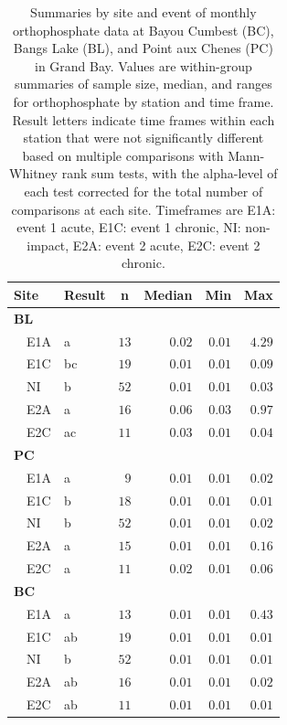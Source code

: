 \documentclass[letterpaper,12pt]{article}\usepackage[]{graphicx}\usepackage[]{color}
\newcommand{\beginsupplement}{%
        \setcounter{table}{0}
        \renewcommand{\thetable}{S\arabic{table}}%
        \setcounter{figure}{0}
        \renewcommand{\thefigure}{S\arabic{figure}}%
     }
\begin{document}
\begin{table}[!tbp]
\caption{Summaries by site and event of monthly orthophosphate data at Bayou Cumbest (BC), Bangs Lake (BL), and Point aux Chenes (PC) in Grand Bay.  Values are within-group summaries of sample size, median, and ranges for orthophosphate by station and time frame.  Result letters indicate time frames within each station that were not significantly different based on multiple comparisons with Mann-Whitney rank sum tests, with the alpha-level of each test corrected for the total number of comparisons at each site. Timeframes are E1A: event 1 acute, E1C: event 1 chronic, NI: non-impact, E2A: event 2 acute, E2C: event 2 chronic.\label{tab:orthtab}} 
\begin{center}
\begin{tabular}{llrrrr}
\hline\hline
\multicolumn{1}{l}{Site}&\multicolumn{1}{c}{Result}&\multicolumn{1}{c}{n}&\multicolumn{1}{c}{Median}&\multicolumn{1}{c}{Min}&\multicolumn{1}{c}{Max}\tabularnewline
\hline
{\bfseries BL}&&&&&\tabularnewline
~~E1A&a&$13$&$0.02$&$0.01$&$4.29$\tabularnewline
~~E1C&bc&$19$&$0.01$&$0.01$&$0.09$\tabularnewline
~~NI&b&$52$&$0.01$&$0.01$&$0.03$\tabularnewline
~~E2A&a&$16$&$0.06$&$0.03$&$0.97$\tabularnewline
~~E2C&ac&$11$&$0.03$&$0.01$&$0.04$\tabularnewline
\hline
{\bfseries PC}&&&&&\tabularnewline
~~E1A&a&$ 9$&$0.01$&$0.01$&$0.02$\tabularnewline
~~E1C&b&$18$&$0.01$&$0.01$&$0.01$\tabularnewline
~~NI&b&$52$&$0.01$&$0.01$&$0.02$\tabularnewline
~~E2A&a&$15$&$0.01$&$0.01$&$0.16$\tabularnewline
~~E2C&a&$11$&$0.02$&$0.01$&$0.06$\tabularnewline
\hline
{\bfseries BC}&&&&&\tabularnewline
~~E1A&a&$13$&$0.01$&$0.01$&$0.43$\tabularnewline
~~E1C&ab&$19$&$0.01$&$0.01$&$0.01$\tabularnewline
~~NI&b&$52$&$0.01$&$0.01$&$0.01$\tabularnewline
~~E2A&ab&$16$&$0.01$&$0.01$&$0.02$\tabularnewline
~~E2C&ab&$11$&$0.01$&$0.01$&$0.01$\tabularnewline
\hline
\end{tabular}\end{center}

\end{table}

\clearpage

\beginsupplement
\end{document}
